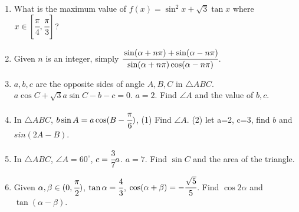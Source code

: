 \documentclass[letterpaper,12pt]{article}
\begin{document}
\begin{enumerate}
    \item What is the maximum value of $f(x)=\sin^2x+\sqrt3\tan x$ where $x\in \left[\cfrac{\pi}{4},\cfrac{\pi}{3}\right]$?
    \item Given $n$ is an integer, simply $\cfrac{\sin(\alpha+n\pi)+\sin(\alpha-n\pi)}{\sin(\alpha+n\pi)\cos(\alpha-n\pi)}$.
    \item $a, b, c$ are the opposite sides of angle $A, B, C$ in $\triangle ABC$. $a\cos C+\sqrt3a\sin C-b-c=0$. $a=2$. Find $\angle A$ and the value of $b, c$.
    \item In $\triangle ABC$, $b\sin A=a\cos(B-\cfrac{\pi}{6})$, (1) Find $\angle A$. (2) let a=2, c=3, find $b$ and $sin(2A-B)$.
    \item In $\triangle ABC$, $\angle A=60^\circ$, $c=\cfrac{3}{7}a$. $a=7$. Find $\sin C$ and the area of the triangle.
    \item Given $\alpha, \beta \in (0,\cfrac{\pi}{2})$, $\tan\alpha=\cfrac{4}{3}$, $\cos(\alpha+\beta)=-\cfrac{\sqrt5}{5}$. Find $\cos 2\alpha$ and $\tan (\alpha-\beta)$.

\end{enumerate}
\end{document}
